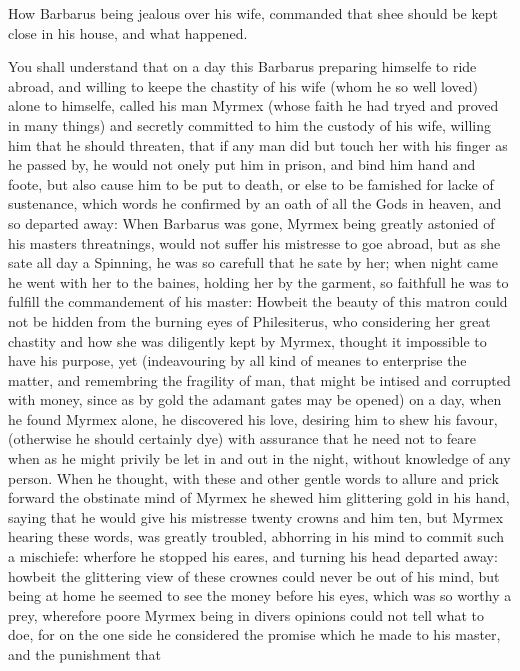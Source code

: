 
How Barbarus being jealous over his wife, commanded that shee should be kept
close in his house, and what happened.

You shall understand that on a day this Barbarus preparing himselfe to ride
abroad, and willing to keepe the chastity of his wife (whom he so well loved)
alone to himselfe, called his man Myrmex (whose faith he had tryed and proved
in many things) and secretly committed to him the custody of his wife, willing
him that he should threaten, that if any man did but touch her with his finger
as he passed by, he would not onely put him in prison, and bind him hand and
foote, but also cause him to be put to death, or else to be famished for lacke
of sustenance, which words he confirmed by an oath of all the Gods in heaven,
and so departed away: When Barbarus was gone, Myrmex being greatly astonied of
his masters threatnings, would not suffer his mistresse to goe abroad, but as
she sate all day a Spinning, he was so carefull that he sate by her; when night
came he went with her to the baines, holding her by the garment, so faithfull
he was to fulfill the commandement of his master: Howbeit the beauty of this
matron could not be hidden from the burning eyes of Philesiterus, who
considering her great chastity and how she was diligently kept by Myrmex,
thought it impossible to have his purpose, yet (indeavouring by all kind of
meanes to enterprise the matter, and remembring the fragility of man, that
might be intised and corrupted with money, since as by gold the adamant gates
may be opened) on a day, when he found Myrmex alone, he discovered his love,
desiring him to shew his favour, (otherwise he should certainly dye) with
assurance that he need not to feare when as he might privily be let in and out
in the night, without knowledge of any person. When he thought, with these and
other gentle words to allure and prick forward the obstinate mind of Myrmex he
shewed him glittering gold in his hand, saying that he would give his mistresse
twenty crowns and him ten, but Myrmex hearing these words, was greatly
troubled, abhorring in his mind to commit such a mischiefe: wherfore he stopped
his eares, and turning his head departed away: howbeit the glittering view of
these crownes could never be out of his mind, but being at home he seemed to
see the money before his eyes, which was so worthy a prey, wherefore poore
Myrmex being in divers opinions could not tell what to doe, for on the one side
he considered the promise which he made to his master, and the punishment that
